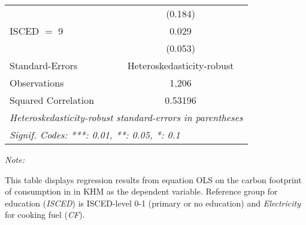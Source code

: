 \begin{table}[htbp!]
\begin{adjustbox}{width = 1\textwidth, max height = 0.95\textheight, center}
\begin{threeparttable}[b]
\begin{tabular}{lc}
                                & (0.184)\\   
            ISCED $=$ 9         & 0.029\\   
                                & (0.053)\\   
            \midrule 
            Standard-Errors     & Heteroskedasticity-robust \\   
            Observations        & 1,206\\  
            Squared Correlation & 0.53196\\  
            \midrule \midrule
            \multicolumn{2}{l}{\emph{Heteroskedasticity-robust standard-errors in parentheses}}\\
            \multicolumn{2}{l}{\emph{Signif. Codes: ***: 0.01, **: 0.05, *: 0.1}}\\
         \end{tabular}
         
         \begin{tablenotes}\item \medskip \textit{Note:}
            \item This table displays regression results from equation OLS on the carbon footprint of consumption in  in KHM as the dependent variable.  Reference group for education (\textit{ISCED}) is ISCED-level 0-1 (primary or no education) and \textit{Electricity} for cooking fuel (\textit{CF}).
         \end{tablenotes}
      \end{threeparttable}
   \end{adjustbox}
\end{table}


